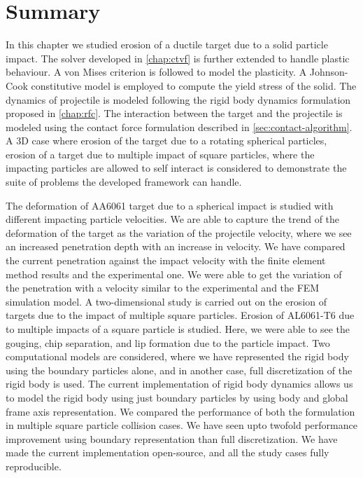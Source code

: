 \FloatBarrier%
\section{Summary}
In this chapter we studied erosion of a ductile target due to a solid particle
impact. The solver developed in \cref{chap:ctvf} is further extended to handle
plastic behaviour. A von Mises criterion is followed to model the plasticity. A
Johnson-Cook constitutive model is employed to compute the yield stress of the
solid. The dynamics of projectile is modeled following the rigid body dynamics
formulation proposed in \cref{chap:rfc}. The interaction between the target and
the projectile is modeled using the contact force formulation described in
\cref{sec:contact-algorithm}. A 3D case where erosion of the target due to a
rotating spherical particles, erosion of a target due to multiple impact of
square particles, where the impacting particles are allowed to self interact is
considered to demonstrate the suite of problems the developed framework can handle.

The deformation of AA6061 target due to a spherical impact is studied with different
impacting particle velocities. We are able to capture the trend of the
deformation of the target as the variation of the projectile velocity, where we
see an increased penetration depth with an increase in velocity. We have
compared the current penetration against the impact velocity with the
finite element method results and the experimental one. We were able to get the
variation of the penetration with a velocity similar to the experimental and the
FEM simulation model. A two-dimensional study is carried out on the erosion of
targets due to the impact of multiple square particles. Erosion of AL6061-T6 due
to multiple impacts of a square particle is studied. Here, we were able to see
the gouging, chip separation, and lip formation due to the particle impact. Two
computational models are considered, where we have represented the rigid body
using the boundary particles alone, and in another case, full discretization of
the rigid body is used. The current implementation of rigid body dynamics allows
us to model the rigid body using just boundary particles by using body and
global frame axis representation. We compared the performance of both the
formulation in multiple square particle collision cases. We have seen upto twofold
performance improvement using boundary representation than full discretization.
We have made the current implementation open-source, and all the study cases fully
reproducible.
